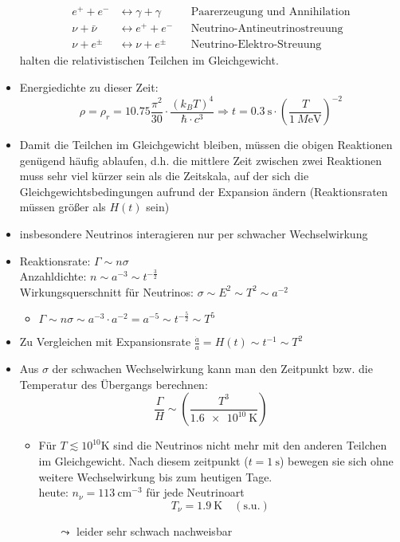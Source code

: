\begin{itemize}
\begin{align*}
			e^++e^-&\leftrightarrow \gamma+\gamma & &\text{Paarerzeugung und Annihilation}\\
			\nu+\bar{\nu}&\leftrightarrow e^++e^- & &\text{Neutrino-Antineutrinostreuung}\\
			\nu+e^\pm&\leftrightarrow\nu+e^\pm & &\text{Neutrino-Elektro-Streuung}
		\end{align*}
		halten die relativistischen Teilchen im Gleichgewicht.
	\item Energiedichte zu dieser Zeit:
		\begin{equation*}
			\rho=\rho_r=\num{10.75}\frac{\pi^2}{30}\cdot\frac{\left(k_BT\right)^4}{\hbar\cdot c^3} \Rightarrow t=\SI{0.3}{\s}\cdot\left(\frac{T}{\SI{1}{M\eV}}\right)^{-2}
		\end{equation*}
	\item Damit die Teilchen im Gleichgewicht bleiben, müssen die obigen Reaktionen genügend häufig ablaufen, d.h. die mittlere Zeit zwischen zwei Reaktionen muss sehr viel kürzer sein als die Zeitskala, auf der sich die Gleichgewichtsbedingungen aufrund der Expansion ändern (Reaktionsraten müssen größer als $H(t)$ sein)
	\item insbesondere Neutrinos interagieren nur per schwacher Wechselwirkung
	\item Reaktionsrate: $\Gamma\sim n\sigma$\\
		Anzahldichte: $n\sim a^{-3}\sim t^{-\frac{3}{2}}$\\
		Wirkungsquerschnitt für Neutrinos: $\sigma\sim E^2\sim T^2\sim a^{-2}$
		\begin{itemize}
			\item $\Gamma\sim n\sigma\sim a^{-3}\cdot a^{-2}=a^{-5}\sim t^{-\frac{5}{2}}\sim T^5$
		\end{itemize}
	\item Zu Vergleichen mit Expansionsrate $\frac{\dot{a}}{a}=H(t)\sim t^{-1}\sim T^2$
	\item Aus $\sigma$ der schwachen Wechselwirkung kann man den Zeitpunkt bzw. die Temperatur des Übergangs berechnen:
		\begin{equation*}
			\frac{\Gamma}{H}\sim\left(\frac{T^3}{\SI{1.6e10}{\K}}\right)
		\end{equation*}
		\begin{itemize}
			\item Für $T\lesssim 10^{10} \si{\K}$ sind die Neutrinos nicht mehr mit den anderen Teilchen im Gleichgewicht. Nach diesem zeitpunkt ($t=\SI{1}{\s}$) bewegen sie sich ohne weitere Wechselwirkung bis zum heutigen Tage.\\
				heute: $n_\nu=\SI{113}{\cm^{-3}}$ für jede Neutrinoart
				\begin{equation*}
					T_\nu=\SI{1.9}{\K} \quad (\text{s.u.})
				\end{equation*}
				\begin{itemize}
					\item[$\leadsto$] leider sehr schwach nachweisbar
				\end{itemize}
		\end{itemize}
\end{itemize}
